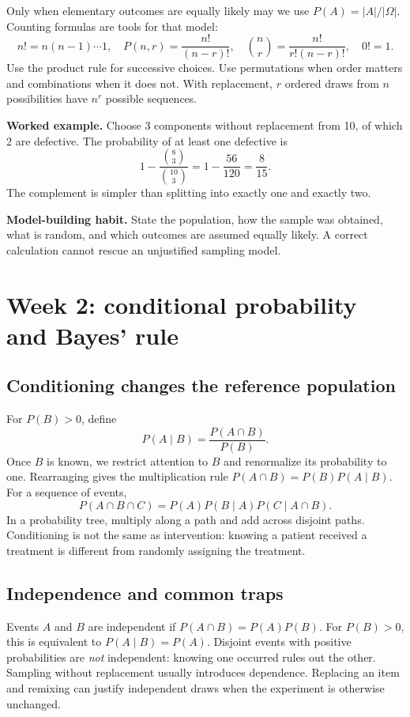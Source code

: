 Only when elementary outcomes are equally likely may we use
$P(A)=|A|/|\Omega|$. Counting formulas are tools for that model:
\[
n!=n(n-1)\cdots1,\quad
P(n,r)=\frac{n!}{(n-r)!},\quad
\binom nr=\frac{n!}{r!(n-r)!},\quad 0!=1.
\]
Use the product rule for successive choices. Use permutations when order
matters and combinations when it does not. With replacement, $r$ ordered
draws from $n$ possibilities have $n^r$ possible sequences.

\textbf{Worked example.} Choose 3 components without replacement from
10, of which 2 are defective. The probability of at least one defective is
\[
1-\frac{\binom83}{\binom{10}3}=1-\frac{56}{120}=\frac8{15}.
\]
The complement is simpler than splitting into exactly one and exactly two.

\textbf{Model-building habit.} State the population, how the sample was
obtained, what is random, and which outcomes are assumed equally likely.
A correct calculation cannot rescue an unjustified sampling model.

\clearpage
\section{Week 2: conditional probability and Bayes' rule}
\subsection{Conditioning changes the reference population}
For $P(B)>0$, define
\[
P(A\mid B)=\frac{P(A\cap B)}{P(B)}.
\]
Once $B$ is known, we restrict attention to $B$ and renormalize its
probability to one. Rearranging gives the multiplication rule
$P(A\cap B)=P(B)P(A\mid B)$. For a sequence of events,
\[
P(A\cap B\cap C)=P(A)P(B\mid A)P(C\mid A\cap B).
\]
In a probability tree, multiply along a path and add across disjoint paths.
Conditioning is not the same as intervention: knowing a patient received a
treatment is different from randomly assigning the treatment.

\subsection{Independence and common traps}
Events $A$ and $B$ are independent if $P(A\cap B)=P(A)P(B)$.
For $P(B)>0$, this is equivalent to $P(A\mid B)=P(A)$.
Disjoint events with positive probabilities are \emph{not} independent:
knowing one occurred rules out the other. Sampling without replacement
usually introduces dependence. Replacing an item and remixing can justify
independent draws when the experiment is otherwise unchanged.

